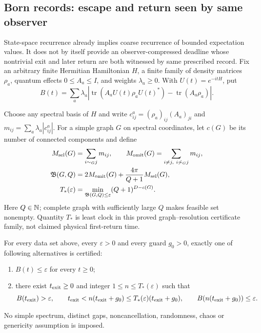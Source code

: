 \subsection{Born records: escape and return seen by same observer}

State-space recurrence already implies coarse recurrence of bounded
expectation values.  It does not by itself provide an observer-compressed
deadline whose nontrivial exit and later return are both witnessed by same
prescribed record.  Fix an arbitrary finite Hermitian Hamiltonian $H$, a
finite family of density matrices $\rho_a$, quantum effects
$0\le A_a\le I$, and weights $\lambda_a\ge0$.  With
$U(t)=e^{-itH}$, put
\begin{equation}
 B(t)=\sum_a\lambda_a
 \left|\operatorname{tr}\!\left(A_aU(t)\rho_aU(t)^*\right)
             -\operatorname{tr}(A_a\rho_a)\right|.          \label{eq:bornrecord}
\end{equation}

Choose any spectral basis of $H$ and write
$c^a_{ij}=(\rho_a)_{ij}(A_a)_{ji}$ and
$m_{ij}=\sum_a\lambda_a|c^a_{ij}|$.  For a simple graph $G$ on spectral
coordinates, let $c(G)$ be its number of connected components and define
\begin{align}
 M_{\rm sel}(G)&=\sum_{i\sim_Gj}m_{ij},\qquad
 M_{\rm omit}(G)=\sum_{i\ne j,\ i\not\sim_Gj}m_{ij},\nonumber\\
 \mathfrak B(G,Q)&=2M_{\rm omit}(G)+
      \frac{4\pi}{Q+1}M_{\rm sel}(G),                       \label{eq:borndist}\\
 T_*(\varepsilon)&=\min_{\mathfrak B(G,Q)\le\varepsilon}
      (Q+1)^{D-c(G)}.                                       \label{eq:borndeadline}
\end{align}
Here $Q\in\mathbb N$; complete graph with sufficiently large $Q$ makes feasible
set nonempty.  Quantity $T_*$ is least clock in this proved
graph--resolution certificate family, not claimed physical first-return
time.

\begin{theorem}
\label{thm:bornreturn}
For every data set above, every $\varepsilon>0$ and every guard $g_0>0$,
exactly one of following alternatives is certified:
\begin{enumerate}[leftmargin=1.55em]
\item $B(t)\le\varepsilon$ for every $t\ge0$;
\item there exist $t_{\rm exit}\ge0$ and integer
$1\le n\le T_*(\varepsilon)$ such that
\begin{equation}
 B(t_{\rm exit})>\varepsilon,\qquad
 t_{\rm exit}<n(t_{\rm exit}+g_0)
 \le T_*(\varepsilon)(t_{\rm exit}+g_0),\qquad
 B\!\left(n(t_{\rm exit}+g_0)\right)\le\varepsilon.
 \label{eq:bornreturn}
\end{equation}
\end{enumerate}
No simple spectrum, distinct gaps, noncancellation, randomness, chaos or
genericity assumption is imposed.
\end{theorem}

